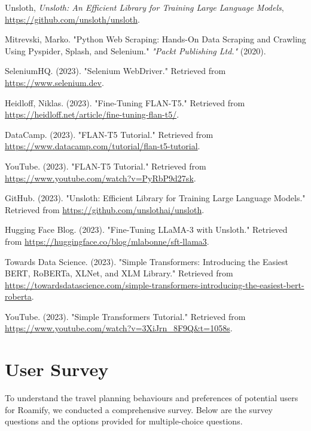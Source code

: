 \documentclass[final,3p,times,authoryear]{elsarticle}
\begin{document}
\begin{thebibliography}{99}
        Unsloth, \emph{Unsloth: An Efficient Library for Training Large Language Models}, \href{https://github.com/unsloth/unsloth}{https://github.com/unsloth/unsloth}.

        Mitrevski, Marko. "Python Web Scraping: Hands-On Data Scraping and Crawling Using Pyspider, Splash, and Selenium." \emph{"Packt Publishing Ltd."} (2020).

        SeleniumHQ. (2023). "Selenium WebDriver." Retrieved from \url{https://www.selenium.dev}.

        Heidloff, Niklas. (2023). "Fine-Tuning FLAN-T5." Retrieved from \url{https://heidloff.net/article/fine-tuning-flan-t5/}.

        DataCamp. (2023). "FLAN-T5 Tutorial." Retrieved from \url{https://www.datacamp.com/tutorial/flan-t5-tutorial}.

        YouTube. (2023). "FLAN-T5 Tutorial." Retrieved from \url{https://www.youtube.com/watch?v=PyRbP9d27sk}.
    
        GitHub. (2023). "Unsloth: Efficient Library for Training Large Language Models." Retrieved from \url{https://github.com/unslothai/unsloth}.
    
        Hugging Face Blog. (2023). "Fine-Tuning LLaMA-3 with Unsloth." Retrieved from \url{https://huggingface.co/blog/mlabonne/sft-llama3}.
    
        Towards Data Science. (2023). "Simple Transformers: Introducing the Easiest BERT, RoBERTa, XLNet, and XLM Library." Retrieved from \url{https://towardsdatascience.com/simple-transformers-introducing-the-easiest-bert-roberta}.
    
        YouTube. (2023). "Simple Transformers Tutorial." Retrieved from \url{https://www.youtube.com/watch?v=3XiJrn_8F9Q&t=1058s}.


\end{thebibliography}

\newpage

\appendix

\section{User Survey}
    To understand the travel planning behaviours and preferences of potential users for Roamify, we conducted a comprehensive survey. Below are the survey questions and the options provided for multiple-choice questions.
    \\
\end{document}
